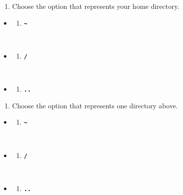 \documentclass[
  letterpaper,
  DIV=11,
  numbers=noendperiod]{scrreprt}
\providecommand{\tightlist}{%
  \setlength{\itemsep}{0pt}\setlength{\parskip}{0pt}}\usepackage{longtable,booktabs,array}
\begin{document}
\begin{enumerate}
\def\labelenumi{\arabic{enumi}.}
\setcounter{enumi}{4}
\tightlist
\item
  Choose the option that represents your home directory.
\end{enumerate}

\begin{itemize}
\item
  \begin{enumerate}
  \def\labelenumi{(\Alph{enumi})}
  \tightlist
  \item
    \textbf{\texttt{\textasciitilde{}}}\strut \\
  \end{enumerate}
\item
  \begin{enumerate}
  \def\labelenumi{(\Alph{enumi})}
  \setcounter{enumi}{1}
  \tightlist
  \item
    \textbf{\texttt{/}}\strut \\
  \end{enumerate}
\item
  \begin{enumerate}
  \def\labelenumi{(\Alph{enumi})}
  \setcounter{enumi}{2}
  \tightlist
  \item
    \textbf{\texttt{..}}
  \end{enumerate}
\end{itemize}

\begin{enumerate}
\def\labelenumi{\arabic{enumi}.}
\setcounter{enumi}{5}
\tightlist
\item
  Choose the option that represents one directory above.
\end{enumerate}

\begin{itemize}
\item
  \begin{enumerate}
  \def\labelenumi{(\Alph{enumi})}
  \tightlist
  \item
    \textbf{\texttt{\textasciitilde{}}}\strut \\
  \end{enumerate}
\item
  \begin{enumerate}
  \def\labelenumi{(\Alph{enumi})}
  \setcounter{enumi}{1}
  \tightlist
  \item
    \textbf{\texttt{/}}\strut \\
  \end{enumerate}
\item
  \begin{enumerate}
  \def\labelenumi{(\Alph{enumi})}
  \setcounter{enumi}{2}
  \tightlist
  \item
    \textbf{\texttt{..}}
  \end{enumerate}
\end{itemize}
\end{document}
